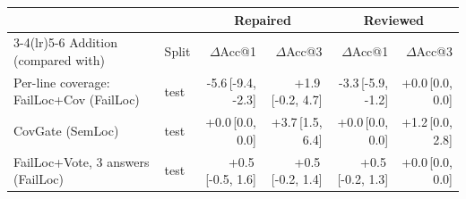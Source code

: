 \begin{tabular}{llrrrr}
\toprule
 & & \multicolumn{2}{c}{Repaired} & \multicolumn{2}{c}{Reviewed} \\
\cmidrule(lr){3-4}\cmidrule(lr){5-6}
Addition (compared with) & Split & $\Delta$Acc@1 & $\Delta$Acc@3 & $\Delta$Acc@1 & $\Delta$Acc@3 \\
\midrule
Per-line coverage: FailLoc+Cov (FailLoc) & test & -5.6{\scriptsize\,[-9.4, -2.3]} & +1.9{\scriptsize\,[-0.2, 4.7]} & -3.3{\scriptsize\,[-5.9, -1.2]} & +0.0{\scriptsize\,[0.0, 0.0]} \\
CovGate (SemLoc) & test & +0.0{\scriptsize\,[0.0, 0.0]} & +3.7{\scriptsize\,[1.5, 6.4]} & +0.0{\scriptsize\,[0.0, 0.0]} & +1.2{\scriptsize\,[0.0, 2.8]} \\
FailLoc+Vote, 3 answers (FailLoc) & test & +0.5{\scriptsize\,[-0.5, 1.6]} & +0.5{\scriptsize\,[-0.2, 1.4]} & +0.5{\scriptsize\,[-0.2, 1.3]} & +0.0{\scriptsize\,[0.0, 0.0]} \\
\bottomrule
\end{tabular}
